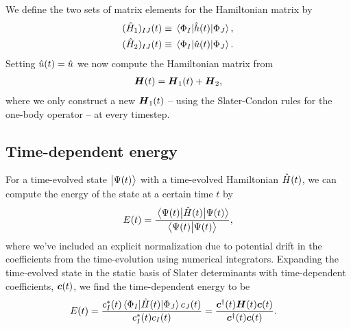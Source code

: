             We define the two sets of matrix elements for the Hamiltonian matrix
            by
            \begin{gather}
                (\hat{H}_1)_{IJ}(t)
                \equiv
                \mel{\Phi_I}{\hat{h}(t)}{\Phi_J}, \\
                (\hat{H}_2)_{IJ}(t)
                \equiv
                \mel{\Phi_I}{\hat{u}(t)}{\Phi_J}.
            \end{gather}
            Setting $\hat{u}(t) = \hat{u}$ we now compute the Hamiltonian
            matrix from
            \begin{align}
                \boldsymbol{H}(t)
                = \boldsymbol{H}_1(t) + \boldsymbol{H}_2,
            \end{align}
            where we only construct a new $\boldsymbol{H}_1(t)$ -- using the
            Slater-Condon rules for the one-body operator -- at every timestep.

        \subsection{Time-dependent energy}
            For a time-evolved state $\ket{\Psi(t)}$ with a time-evolved
            Hamiltonian $\hat{H}(t)$, we can compute the energy of the state at a
            certain time $t$ by
            \begin{align}
                E(t) = \frac{
                    \mel{\Psi(t)}{\hat{H}(t)}{\Psi(t)}
                }{
                    \braket{\Psi(t)}
                },
            \end{align}
            where we've included an explicit normalization due to potential
            drift in the coefficients from the time-evolution using numerical
            integrators.
            Expanding the time-evolved state in the static basis of Slater
            determinants with time-dependent coefficients, $\boldsymbol{c}(t)$, we find
            the time-dependent energy to be
            \begin{align}
                E(t)
                &=
                \frac{
                    c^{*}_I(t)\mel{\Phi_I}{\hat{H}(t)}{\Phi_J}c_J(t)
                }{
                    c^{*}_I(t)c_I(t)
                }
                = \frac{
                    \boldsymbol{c}^{\dagger}(t)\boldsymbol{H}(t)\boldsymbol{c}(t)
                }{
                    \boldsymbol{c}^{\dagger}(t)\boldsymbol{c}(t)
                }.
            \end{align}


